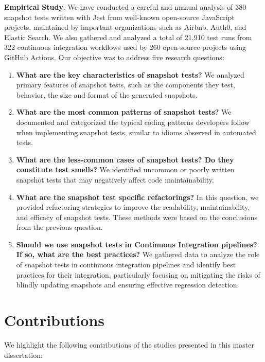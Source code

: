 \documentclass[
	msc, %
	english %
]{../ppgccufmg}
\begin{document}
        \noindent\textbf{Empirical Study}. We have conducted a careful and manual analysis of 380 snapshot tests written with Jest from well-known open-source JavaScript projects, maintained by important organizations such as Airbnb, Auth0, and Elastic Search. We also gathered and analyzed a total of 21,910 test runs from 322 continuous integration workflows used by 260 open-source projects using GitHub Actions. Our objective was to address five research questions:

        \begin{enumerate}
            \item \textbf{What are the key characteristics of snapshot tests?} We analyzed primary features of snapshot tests, such as the components they test, behavior, the size and format of the generated snapshots.
            \item \textbf{What are the most common patterns of snapshot tests?} We documented and categorized the typical coding patterns developers follow when implementing snapshot tests, similar to idioms observed in automated tests.
            \item \textbf{What are the less-common cases of snapshot tests? Do they constitute test smells?} We identified uncommon or poorly written snapshot tests that may negatively affect code maintainability.
            \item \textbf{What are the snapshot test specific refactorings?}
            In this question, we provided refactoring strategies to improve the readability, maintainability, and efficacy of snapshot tests. These methods were based on the conclusions from the previous question.
            \item \textbf{Should we use snapshot tests in Continuous Integration pipelines? If so, what are the best practices?} We gathered data to analyze the role of snapshot tests in continuous integration pipelines and identify best practices for their integration, particularly focusing on mitigating the risks of blindly updating snapshots and ensuring effective regression detection.
        \end{enumerate}

  	\section{Contributions}\label{sec:ch1-contributions}
        We highlight the following contributions of the studies presented in this master dissertation:
\end{document}
